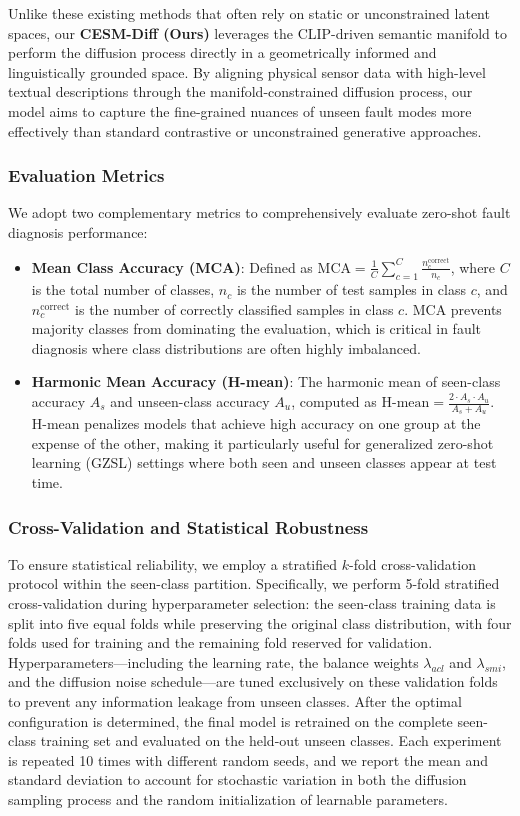 Unlike these existing methods that often rely on static or unconstrained latent spaces, our \textbf{CESM-Diff (Ours)} leverages the CLIP-driven semantic manifold to perform the diffusion process directly in a geometrically informed and linguistically grounded space. By aligning physical sensor data with high-level textual descriptions through the manifold-constrained diffusion process, our model aims to capture the fine-grained nuances of unseen fault modes more effectively than standard contrastive or unconstrained generative approaches.

\subsubsection{Evaluation Metrics}
We adopt two complementary metrics to comprehensively evaluate zero-shot fault diagnosis performance:
\begin{itemize}
    \item \textbf{Mean Class Accuracy (MCA)}: Defined as $\mathrm{MCA} = \frac{1}{C} \sum_{c=1}^{C} \frac{n_c^{\text{correct}}}{n_c}$, where $C$ is the total number of classes, $n_c$ is the number of test samples in class $c$, and $n_c^{\text{correct}}$ is the number of correctly classified samples in class $c$. MCA prevents majority classes from dominating the evaluation, which is critical in fault diagnosis where class distributions are often highly imbalanced.
    \item \textbf{Harmonic Mean Accuracy (H-mean)}: The harmonic mean of seen-class accuracy $A_s$ and unseen-class accuracy $A_u$, computed as $\mathrm{H\text{-}mean} = \frac{2 \cdot A_s \cdot A_u}{A_s + A_u}$. H-mean penalizes models that achieve high accuracy on one group at the expense of the other, making it particularly useful for generalized zero-shot learning (GZSL) settings where both seen and unseen classes appear at test time.
\end{itemize}

\subsubsection{Cross-Validation and Statistical Robustness}
To ensure statistical reliability, we employ a stratified $k$-fold cross-validation protocol within the seen-class partition. Specifically, we perform 5-fold stratified cross-validation during hyperparameter selection: the seen-class training data is split into five equal folds while preserving the original class distribution, with four folds used for training and the remaining fold reserved for validation. Hyperparameters---including the learning rate, the balance weights $\lambda_{acl}$ and $\lambda_{smi}$, and the diffusion noise schedule---are tuned exclusively on these validation folds to prevent any information leakage from unseen classes. After the optimal configuration is determined, the final model is retrained on the complete seen-class training set and evaluated on the held-out unseen classes. Each experiment is repeated 10 times with different random seeds, and we report the mean and standard deviation to account for stochastic variation in both the diffusion sampling process and the random initialization of learnable parameters.

